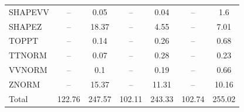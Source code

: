\begin{table}[H]
\begin{center}
\begin{footnotesize}
\begin{tabular}{lcccccc}
				SHAPEVV & -- &  0.05 & -- &  0.04 & -- &  1.6 \\
				SHAPEZ & -- &  18.37 & -- &  4.55 & -- &  7.01 \\
				TOPPT & -- &  0.14 & -- &  0.26 & -- &  0.68 \\
				TTNORM & -- &  0.07 & -- &  0.28 & -- &  0.23 \\
				VVNORM & -- &  0.1 & -- &  0.19 & -- &  0.66 \\
				ZNORM & -- &  15.37 & -- &  11.31 & -- &  10.16 \\
				Total &  122.76  &  247.57 &  102.11  &  243.33 &  102.74  &  255.02 \\ \hline \hline
			\end{tabular}
			\label{tab:SysUncertainties_4000}
        \end{footnotesize}
	\end{center}
\end{table}
